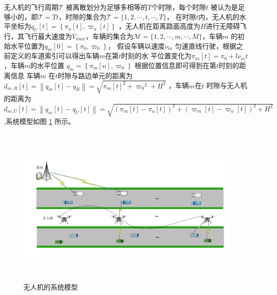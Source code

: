 无人机的飞行周期$\mathcal{T}$ 被离散划分为足够多相等的$T $个时隙，每个时隙$t$ 被认为是足够小的，即$\mathcal{T}=Tt $，时隙的集合为$\mathcal{T}=\{1,2,\cdots ,t,\cdots ,T\}$，
在时隙$t$内，无人机的水平坐标为$q_U\left[t\right]=\left\{\pi_u\left[t\right],\varpi_u\left[t\right]\right\}$
，无人机在距离路面高度为$H$进行无障碍飞行，其飞行最大速度为$V_{max}$，车辆的集合为$\mathcal{M}=\{1,2,\cdots ,m,\cdots ,M\}$，车辆$m$ 的初始水平位置为$q_m\left[0\right]=\left\{\pi_0,\varpi_0\right\}$，
假设车辆以速度$\nu_m$ 匀速直线行驶，根据之前定义的车道索引可以得出车辆$m$在第$t$时刻的水
平位置变化为$\pi_m\left[t\right]=\pi_0+l\nu_m t$，车辆$m$的水平位置 $q_m=\left\{\pi_m\left[n\right],\varpi_0\right\}$
根据位置信息即可得到在第$t$时刻的距离信息
车辆$m$ 在$t$时隙与路边单元的距离为${{d}_{m,R}}\left[ t \right]=\left\| {{q}_{m}}\left[ t \right]-{{q}_{R}} \right\|=\sqrt{{{\pi}_{m}}{{\left[ t \right]}^{2}}+{{\varpi}_{0}}^{2}+{{H}^{2}}}$
，车辆$m$在$t$ 时隙与无人机的距离为
$
{{d}_{m,U}}\left[ t \right]=\left\| {{q}_{m}}\left[ t \right]-{{q}_{U}}\left[ t \right] \right\|=\sqrt{{{\left( {{\pi}_{m}}\left[ t \right]-{{\pi}_{u}}\left[ t \right] \right)}^{2}}+{{\left( {{\varpi}_{m}}\left[ t \right]-{{\varpi}_{u}}\left[ t \right] \right)}^{2}}+{{H}^{2}}}\
$,系统模型如图 \ref{systemuav2} 所示。%

\begin{figure}[H]
\centering
\includegraphics[width=12cm,height=8cm]{figures//chap4//第四章系统模型图.pdf}
\caption{无人机的系统模型}
\label{systemuav2}
\end{figure}
